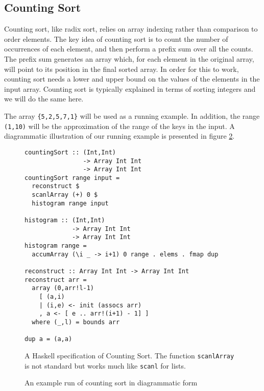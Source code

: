 \subsection{Counting Sort}
\label{sec:algorithm}

Counting sort, like radix sort, relies on array indexing rather than
comparison to order elements. The key idea of counting sort is to
count the number of occurrences of each element, and then perform a
prefix sum over all the counts. The prefix sum generates an array
which, for each element in the original array, will point to its
position in the final sorted array. In order for this to work,
counting sort needs a lower and upper bound on the values of the
elements in the input array. Counting sort is typically explained in
terms of sorting integers and we will do the same here.

The array \verb!{5,2,5,7,1}! will be used as a running example. In
addition, the range \verb!(1,10)! will be the approximation of the
range of the keys in the input. A diagrammatic illustration of our
running example is presented in figure \ref{fig:example}.

\begin{figure}
\begin{small} 
\begin{verbatim}
countingSort :: (Int,Int) 
                -> Array Int Int 
                -> Array Int Int
countingSort range input =
  reconstruct $
  scanlArray (+) 0 $
  histogram range input

histogram :: (Int,Int) 
             -> Array Int Int 
             -> Array Int Int
histogram range = 
  accumArray (\i _ -> i+1) 0 range . elems . fmap dup

reconstruct :: Array Int Int -> Array Int Int
reconstruct arr = 
  array (0,arr!l-1)
    [ (a,i)
    | (i,e) <- init (assocs arr)
    , a <- [ e .. arr!(i+1) - 1] ]
  where (_,l) = bounds arr

dup a = (a,a)
\end{verbatim}
\end{small}
\caption{A Haskell specification of Counting Sort. The function
  \texttt{scanlArray} is not standard but works much like
  \texttt{scanl}
  for lists.}
\label{fig:haskell}
\end{figure}

\begin{figure}

\caption{An example run of counting sort in diagrammatic form}
\label{fig:example}
\end{figure}
 

